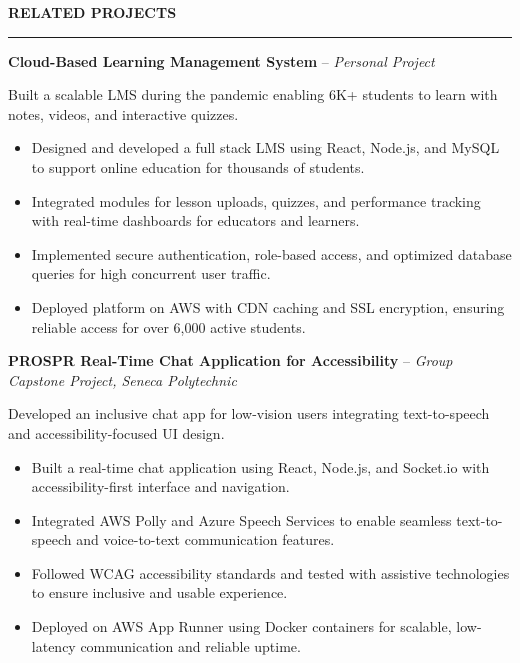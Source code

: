 \documentclass[10pt,letterpaper]{article}
\begin{document}
\vspace{6pt}

\textbf{RELATED PROJECTS}\\[-8pt]
\noindent\rule{\textwidth}{1pt}

\vspace{-2pt}

\textbf{Cloud-Based Learning Management System} -- \emph{Personal Project}

\vspace{-1pt}

Built a scalable LMS during the pandemic enabling 6K+ students to learn with notes, videos, and interactive quizzes.
\vspace{-1pt}
\begin{itemize}
\item Designed and developed a full stack LMS using React, Node.js, and MySQL to support online education for thousands of students.
\item Integrated modules for lesson uploads, quizzes, and performance tracking with real-time dashboards for educators and learners.
\item Implemented secure authentication, role-based access, and optimized database queries for high concurrent user traffic.
\item Deployed platform on AWS with CDN caching and SSL encryption, ensuring reliable access for over 6,000 active students.
\end{itemize}

\textbf{PROSPR  Real-Time Chat Application for Accessibility} -- \emph{Group Capstone Project, Seneca Polytechnic}

\vspace{-1pt}

Developed an inclusive chat app for low-vision users integrating text-to-speech and accessibility-focused UI design.
\vspace{-1pt}
\begin{itemize}
\item Built a real-time chat application using React, Node.js, and Socket.io with accessibility-first interface and navigation.
\item Integrated AWS Polly and Azure Speech Services to enable seamless text-to-speech and voice-to-text communication features.
\item Followed WCAG accessibility standards and tested with assistive technologies to ensure inclusive and usable experience.
\item Deployed on AWS App Runner using Docker containers for scalable, low-latency communication and reliable uptime.
\end{itemize}
\end{document}
